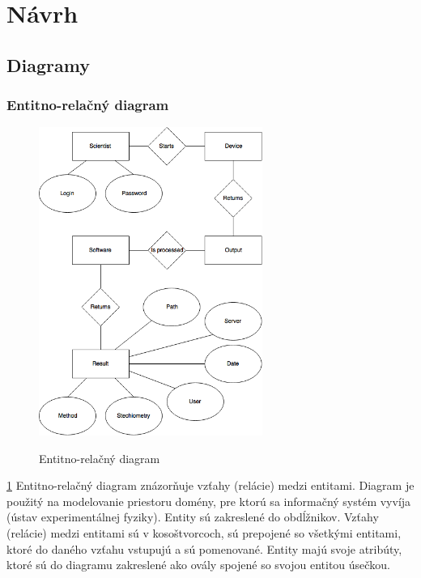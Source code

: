 \documentclass[12pt,a4paper]{article}
\begin{document}
\section{Návrh}

\subsection{Diagramy}

\subsubsection{Entitno-relačný diagram}
\begin{figure}[H]
	\centering
	\caption{Entitno-relačný diagram}
	\includegraphics[width=0.65\textwidth]{er_diagram}
	\label{fig:er_diagram}
\end{figure}
\ref{fig:er_diagram}
Entitno-relačný diagram znázorňuje vzťahy (relácie) medzi entitami. Diagram je použitý na modelovanie priestoru domény, pre ktorú sa informačný systém vyvíja (ústav experimentálnej fyziky). Entity sú zakreslené do obdĺžnikov. Vzťahy (relácie) medzi entitami sú v kosoštvorcoch, sú prepojené so všetkými entitami, ktoré do daného vzťahu vstupujú a sú pomenované. Entity majú svoje atribúty, ktoré sú do diagramu zakreslené ako ovály spojené so svojou entitou úsečkou.
\end{document}
